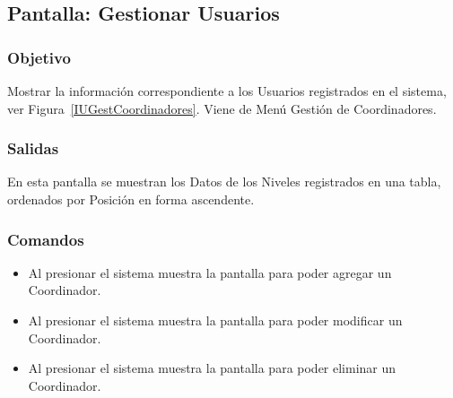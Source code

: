 \subsection{Pantalla: Gestionar Usuarios}

\subsubsection{Objetivo}
  Mostrar la información correspondiente a los Usuarios registrados en el sistema, ver Figura~\ref{IUGestCoordinadores}. Viene de Menú Gestión de Coordinadores.
  
  

\subsubsection{Salidas}
  En esta pantalla se muestran los Datos de los Niveles registrados en una tabla, ordenados por Posición en forma ascendente.

\subsubsection{Comandos}
\begin{itemize}
 \item Al presionar  el sistema muestra la pantalla  para poder agregar un Coordinador.
 \item Al presionar  el sistema muestra la pantalla  para poder modificar un Coordinador.
 \item Al presionar  el sistema muestra la pantalla  para poder eliminar un Coordinador.
\end{itemize}

